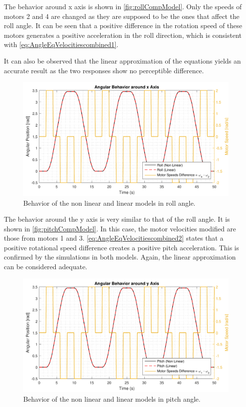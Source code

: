 The behavior around x axis is shown in \autoref{fig:rollCompModel}. Only the speeds of motors 2 and 4 are changed as they are supposed to be the ones that affect the roll angle. It can be seen that a positive difference in the rotation speed of these motors generates a positive acceleration in the roll direction, which is consistent with \autoref{eq:AngleEqVelocitiescombined1}.

It can also be observed that the linear approximation of the equations yields an accurate result as the two responses show no perceptible difference. 
%
\begin{figure}[H]
	\centering
	\includegraphics[scale=0.65]{figures/rollCompModel}
	\caption{Behavior of the non linear and linear models in roll angle.}
	\label{fig:rollCompModel}
\end{figure}
%
The behavior around the y axis is very similar to that of the roll angle. It is shown in \autoref{fig:pitchCompModel}. In this case, the motor velocities modified are those from motors 1 and 3. 
%
\autoref{eq:AngleEqVelocitiescombined2} states that a positive rotational speed difference creates a positive pitch acceleration. This is confirmed by the simulations in both models. Again, the linear approximation can be considered adequate.
\begin{figure}[H]
	\centering
	\includegraphics[scale=0.65]{figures/pitchCompModel}
	\caption{Behavior of the non linear and linear models in pitch angle.}
	\label{fig:pitchCompModel}
\end{figure}
